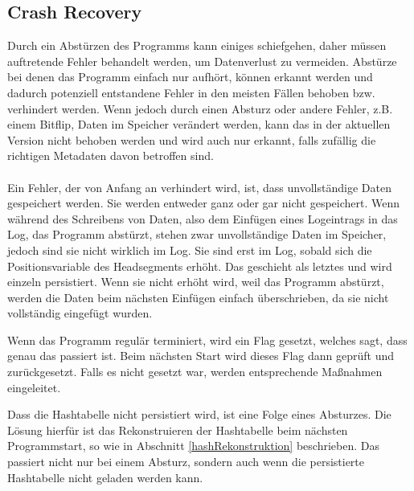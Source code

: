 \documentclass{class/thesis}
\begin{document}
\begin{thesis}
	\section{Crash Recovery}
	Durch ein Abstürzen des Programms kann einiges schiefgehen, daher müssen auftretende Fehler behandelt werden, um Datenverlust zu vermeiden. Abstürze bei denen das Programm einfach nur aufhört, können erkannt werden und dadurch potenziell entstandene Fehler in den meisten Fällen behoben bzw. verhindert werden. 
	Wenn jedoch durch einen Absturz oder andere Fehler, z.B. einem Bitflip, Daten im Speicher verändert werden, kann das in der aktuellen Version nicht behoben werden und wird auch nur erkannt, falls zufällig die richtigen Metadaten davon betroffen sind.
	\\
	\\
	Ein Fehler, der von Anfang an verhindert wird, ist, dass unvollständige Daten gespeichert werden. Sie werden entweder ganz oder gar nicht gespeichert.
	Wenn während des Schreibens von Daten, also dem Einfügen eines Logeintrags in das Log, das Programm abstürzt, stehen zwar unvollständige Daten im Speicher, jedoch sind sie nicht wirklich im Log.
	Sie sind erst im Log, sobald sich die Positionsvariable des Headsegments erhöht. Das geschieht als letztes und wird einzeln persistiert.
	Wenn sie nicht erhöht wird, weil das Programm abstürzt, werden die Daten beim nächsten Einfügen einfach überschrieben, da sie nicht vollständig eingefügt wurden.
	
	Wenn das Programm regulär terminiert, wird ein Flag gesetzt, welches sagt, dass genau das passiert ist.
	Beim nächsten Start wird dieses Flag dann geprüft und zurückgesetzt. Falls es nicht gesetzt war, werden entsprechende Maßnahmen eingeleitet.
	
	Dass die Hashtabelle nicht persistiert wird, ist eine Folge eines Absturzes. Die Lösung hierfür ist das Rekonstruieren der Hashtabelle beim nächsten Programmstart, so wie in Abschnitt \ref{hashRekonstruktion} beschrieben. Das passiert nicht nur bei einem Absturz, sondern auch wenn die persistierte Hashtabelle nicht geladen werden kann.
	

\end{thesis}
\end{document}
